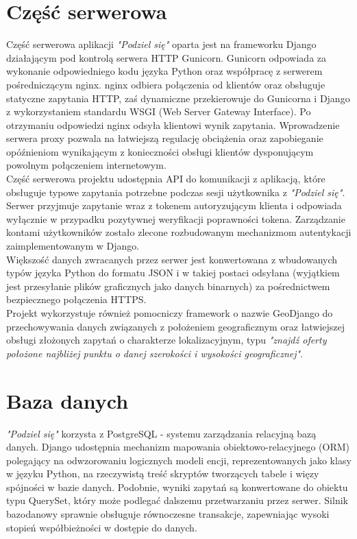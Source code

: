 \documentclass[12pt]{article}
\begin{document}
\section*{Część serwerowa}
Część serwerowa aplikacji \textit{"Podziel się"} oparta jest na frameworku Django działającym pod kontrolą serwera HTTP Gunicorn. Gunicorn odpowiada za wykonanie odpowiedniego kodu języka Python oraz współpracę z serwerem pośredniczącym nginx. nginx odbiera połączenia od klientów oraz obsługuje statyczne zapytania HTTP, zaś dynamiczne przekierowuje do Gunicorna i Django z wykorzystaniem standardu WSGI (Web Server Gateway Interface). Po otrzymaniu odpowiedzi nginx odsyła klientowi wynik zapytania. Wprowadzenie serwera proxy pozwala na łatwiejszą regulację obciążenia oraz zapobieganie opóźnieniom wynikającym z konieczności obsługi klientów dysponującym powolnym połączeniem internetowym.
\vspace{4mm}\\Część serwerowa projektu udostępnia API do komunikacji z aplikacją, które obsługuje typowe zapytania potrzebne podczas sesji użytkownika z \textit{"Podziel się"}. Serwer przyjmuje zapytanie wraz z tokenem autoryzującym klienta i odpowiada wyłącznie w przypadku pozytywnej weryfikacji poprawności tokena. Zarządzanie kontami użytkowników zostało zlecone rozbudowanym mechanizmom autentykacji zaimplementowanym w Django.
\vspace{4mm}\\Większość danych zwracanych przez serwer jest konwertowana z wbudowanych typów języka Python do formatu JSON i w takiej postaci odsyłana (wyjątkiem jest przesyłanie plików graficznych jako danych binarnych) za pośrednictwem bezpiecznego połączenia HTTPS.
\vspace{4mm}\\Projekt wykorzystuje również pomocniczy framework o nazwie GeoDjango do przechowywania danych związanych z położeniem geograficznym oraz łatwiejszej obsługi złożonych zapytań o charakterze lokalizacyjnym, typu  \textit{"znajdź oferty położone najbliżej punktu o danej szerokości i wysokości geograficznej"}.

\section*{Baza danych}
\textit{"Podziel się"} korzysta z PostgreSQL - systemu zarządzania relacyjną bazą danych. Django udostępnia mechanizm mapowania obiektowo-relacyjnego (ORM) polegający na odwzorowaniu logicznych modeli encji, reprezentowanych jako klasy w języku Python, na rzeczywistą treść skryptów tworzących tabele i więzy spójności w bazie danych. Podobnie, wyniki zapytań są konwertowane do obiektu typu QuerySet, który może podlegać dalszemu przetwarzaniu przez serwer. Silnik bazodanowy sprawnie obsługuje równoczesne transakcje, zapewniając wysoki stopień współbieżności w dostępie do danych.
\end{document}
